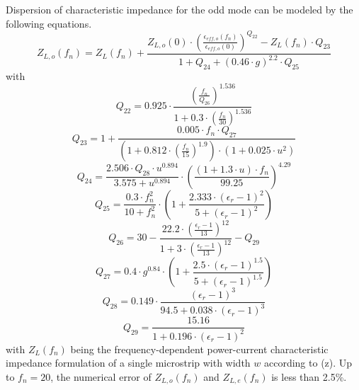 \documentclass[10pt]{report}
\begin{document}
Dispersion of characteristic impedance for the odd mode can be
modeled by the following equations.
\begin{equation}
Z_{L,o}(f_n) = Z_L(f_n) + \frac{ Z_{L,o}(0)\cdot
               \left( \frac{\epsilon_{eff,o}(f_n)}{\epsilon_{eff,o}(0)} \right) ^{Q_{22}}
	     - Z_L(f_n)\cdot Q_{23} }{ 1+Q_{24}+(0.46\cdot g)^{2.2} \cdot Q_{25} }
\end{equation}
with
\begin{equation}
Q_{22} = 0.925\cdot \frac{ \left( \frac{f_n}{Q_{26}} \right) ^{1.536} }
                         { 1+0.3\cdot \left( \frac{f_n}{30} \right)^{1.536} }
\end{equation}
\begin{equation}
Q_{23} = 1+ \frac{ 0.005\cdot f_n\cdot Q_{27} }
                 { \left( 1+0.812\cdot\left( \frac{f_n}{15} \right) ^{1.9} \right) \cdot
		   (1 + 0.025\cdot u^2) }
\end{equation}
\begin{equation}
Q_{24} = \frac{2.506\cdot Q_{28}\cdot u^{0.894}}{3.575+u^{0.894}} \cdot
         \left( \frac{ (1+1.3\cdot u)\cdot f_n}{99.25} \right)^{4.29}
\end{equation}
\begin{equation}
Q_{25} = \frac{0.3\cdot f_n^2}{10+f_n^2}\cdot
         \left( 1+ \frac{2.333\cdot (\epsilon_r-1)^2}{5+(\epsilon_r-1)^2} \right)
\end{equation}
\begin{equation}
Q_{26} = 30 - \frac{ 22.2\cdot \left( \frac{\epsilon_r-1}{13} \right)^{12} }
                   { 1+ 3\cdot \left( \frac{\epsilon_r-1}{13} \right)^{12} } - Q_{29}
\end{equation}
\begin{equation}
Q_{27} = 0.4\cdot g^{0.84}\cdot \left( 1+
         \frac{2.5\cdot (\epsilon_r-1)^{1.5}}{5+(\epsilon_r-1)^{1.5}} \right)
\end{equation}
\begin{equation}
Q_{28} = 0.149\cdot \frac{(\epsilon_r-1)^3}{94.5+0.038\cdot (\epsilon_r-1)^3}
\end{equation}
\begin{equation}
Q_{29} = \frac{15.16}{1+0.196\cdot (\epsilon_r-1)^2}
\end{equation}
with $Z_L(f_n)$ being the frequency-dependent power-current characteristic
impedance formulation of a single microstrip with width $w$ according to (z).
Up to $f_n=20$, the numerical error of $Z_{L,o}(f_n)$ and $Z_{L,e}(f_n)$ is
less than 2.5\%.
\end{document}
